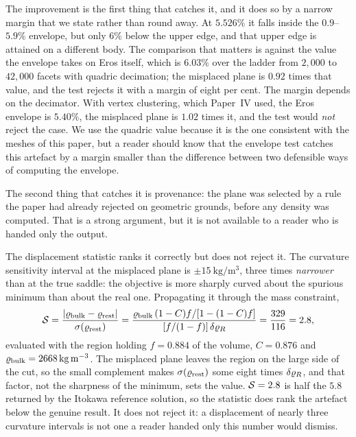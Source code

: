 The improvement is the first thing that catches it, and it does so by a
narrow margin that we state rather than round away. At $5.526\%$ it falls
inside the $0.9$--$5.9\%$ envelope, but only $6\%$ below the upper edge,
and that upper edge is attained on a different body. The comparison that
matters is against the value the envelope takes on Eros itself, which is
$6.03\%$ over the ladder from $2{,}000$ to $42{,}000$ facets with quadric
decimation; the misplaced plane is $0.92$ times that value, and the test
rejects it with a margin of eight per cent. The margin depends on the
decimator. With vertex clustering, which Paper~IV used, the Eros envelope is
$5.40\%$, the misplaced plane is $1.02$ times it, and the test would
\emph{not} reject the case. We use the quadric value because it is the one
consistent with the meshes of this paper, but a reader should know that the
envelope test catches this artefact by a margin smaller than the difference
between two defensible ways of computing the envelope.

The second thing that catches it is provenance: the plane was selected by
a rule the paper had already rejected on geometric grounds, before any
density was computed. That is a strong argument, but it is not available
to a reader who is handed only the output.

The displacement statistic ranks it correctly but does not reject it. The
curvature sensitivity interval at the misplaced plane is
$\pm\SI{15}{\kilo\gram\per\cubic\metre}$, three times \emph{narrower}
than at the true saddle: the objective is more sharply curved about the
spurious minimum than about the real one. Propagating it through the mass
constraint,
%
\begin{equation}
\mathcal{S} = \frac{\lvert\varrho_{\mathrm{bulk}}-\varrho_{\mathrm{rest}}\rvert}{\sigma(\varrho_{\mathrm{rest}})}
       = \frac{\varrho_{\mathrm{bulk}}\,(1-C)f/[1-(1-C)f]}
              {[f/(1-f)]\,\delta\varrho_{R}}
       = \frac{329}{116} = 2.8 ,
\label{eq:sfail}
\end{equation}
%
evaluated with the region holding $f = 0.884$ of the volume, $C = 0.876$
and $\varrho_{\mathrm{bulk}} = \SI{2668}{\kilo\gram\per\cubic\metre}$. The misplaced
plane leaves the region on the large side of the cut, so the small
complement makes $\sigma(\varrho_{\mathrm{rest}})$ some eight times $\delta\varrho_{R}$, and
that factor, not the sharpness of the minimum, sets the value. $\mathcal{S} = 2.8$
is half the $5.8$ returned by the Itokawa reference solution, so the
statistic does rank the artefact below the genuine result. It does not
reject it: a displacement of nearly three curvature intervals is not one a
reader handed only this number would dismiss.

